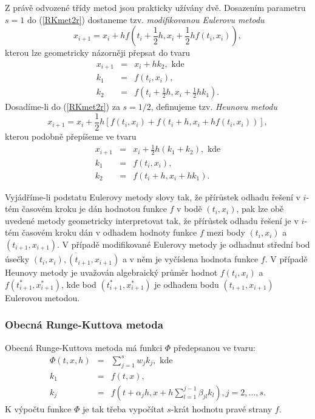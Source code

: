\documentclass[a4paper, 12pt]{book}
\theoremstyle{definition}
\begin{document}
Z právě odvozené třídy metod jsou prakticky užívány dvě. Dosazením parametru 
$s=1$ do (\ref{RKmet2r}) dostaneme tzv. {\em modifikovanou Eulerovu metodu}
\begin{equation}\label{modifEuler}
x_{i+1}=x_i + h f(t_i+\frac 12 h, x_i+\frac 12 hf(t_i,x_i)),
\end{equation}
kterou lze geometricky názorněji přepsat do tvaru
\begin{eqnarray*}
x_{i+1}&=&x_i + h k_2, \mbox{~kde}\\
k_1 &=& f(t_i,x_i),\\
k_2 &=& f(t_i+\frac 12 h, x_i+\frac 12 h k_1).
\end{eqnarray*}
Dosadíme-li do (\ref{RKmet2r}) za $s=1/2$, definujeme tzv. {\em Heunovu metodu}
\begin{equation}\label{Heun}
x_{i+1}=x_i + \frac 12h[f(t_i,x_i)+f(t_i+h, x_i+hf(t_i,x_i))],
\end{equation}
kterou podobně přepíšeme ve tvaru
\begin{eqnarray*}
x_{i+1}&=&x_i + \frac 12 h (k_1 + k_2), \mbox{~kde}\\
k_1 &=& f(t_i,x_i),\\
k_2 &=& f(t_i+h, x_i+h k_1).
\end{eqnarray*}


Vyjádříme-li podstatu Eulerovy metody slovy tak, že přírůstek odhadu řešení 
v $i$-tém časovém kroku je dán hodnotou funkce $f$ v bodě $(t_i,x_i)$, pak 
lze obě uvedené metody geometricky interpretovat tak, že přírůstek odhadu
řešení je v $i$-tém časovém kroku dán v odhadem hodnoty funkce $f$ mezi body
$(t_i,x_i)$ a $(t_{i+1}, x_{i+1})$. V případě modifikované Eulerovy metody je
odhadnut střední bod úsečky $\overline{(t_i,x_i),(t_{i+1}, x_{i+1})}$ a v něm
je vyčíslena hodnota funkce $f$. V případě Heunovy metody je uvažován 
algebraický průměr hodnot $f(t_i,x_i)$ a $f(t_{i+1}^*, x_{i+1}^*)$, kde
bod $(t_{i+1}^*, x_{i+1}^*)$ je odhadem bodu $(t_{i+1}, x_{i+1})$ Eulerovou
metodou.

\subsubsection{Obecná Runge-Kuttova metoda}
Obecná Runge-Kuttova metoda má funkci $\Phi$ předepsanou ve tvaru:
\begin{eqnarray*}
\Phi(t,x,h) &=& \sum_{j=1}^s w_jk_j,\mbox{~kde}\\
k_1 &=& f(t,x),\\
k_j &=& f\left(t+\alpha_j h, x+h\sum_{l=1}^{j-1}\beta_{jl}k_l\right), j=2,\dots,s.
\end{eqnarray*}
K výpočtu funkce $\Phi$ je tak třeba vypočítat $s$-krát hodnotu pravé strany $f$.
\end{document}
